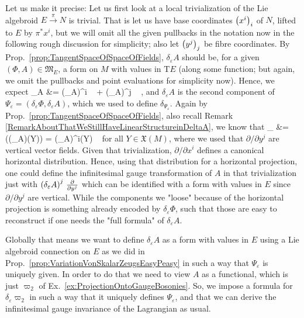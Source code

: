 Let us make it precise: Let us first look at a local trivialization of the Lie algebroid $E \stackrel{\pi}{\to} N$ is trivial. That is let us have base coordinates $\mleft( x^i \mright)_i$ of $N$, lifted to $E$ by $\pi^*x^i$, but we will omit all the given pullbacks in the notation now in the following rough discussion for simplicity; also let $\mleft( y^j \mright)_j$ be fibre coordinates. By Prop.~\ref{prop:TangentSpaceOfSpaceOfFields}, $\delta_\varepsilon A$ should be, for a given $(\Phi, A) \in \mathfrak{M}_E$, a form on $M$ with values in $\mathrm{T}E$ (along some function; but again, we omit the pullbacks and point evaluations for simplicity now). Hence, we expect
\bas
\delta_\varepsilon A
&=
\mleft(\delta_\varepsilon A\mright)^i ~ 
	+ \mleft(\delta_\varepsilon A\mright)^j ~ ,
\eas
and $\delta_\varepsilon A$ is the second component of $\Psi_\varepsilon = (\delta_\varepsilon \Phi, \delta_\varepsilon A)$, which we used to define $\delta_{\Psi_\varepsilon}$. Again by Prop.~\ref{prop:TangentSpaceOfSpaceOfFields}, also recall Remark \ref{RemarkAboutThatWeStillHaveLinearStructureinDeltaA}, we know that
\bas
\delta_\varepsilon \Phi
&=
\pi \bigl((\delta_\varepsilon A)(Y)\bigr)
=
\mleft(\delta_\varepsilon A\mright)^i(Y) ~ 
\eas
for all $Y \in \mathfrak{X}(M)$, where we used that $\partial/\partial y^j$ are vertical vector fields. Given that trivialization, $\partial/\partial x^i$ defines a canonical horizontal distribution. Hence, using that distribution for a horizontal projection, one could define the infinitesimal gauge transformation of $A$ in that trivialization just with $\mleft(\delta_\varepsilon A\mright)^j ~ \frac{\partial}{\partial y^j}$ which can be identified with a form with values in $E$ since $\partial/\partial y^j$ are vertical. While the components we "loose" because of the horizontal projection is something already encoded by $\delta_\varepsilon \Phi$, such that those are easy to reconstruct if one needs the "full formula" of $\delta_\varepsilon A$.

Globally that means we want to define $\delta_\varepsilon A$ as a form with values in $E$ using a Lie algebroid connection on $E$ as we did in Prop.~\ref{prop:VariationVonSkalarZeugsEasyPeasy} in such a way that $\Psi_\varepsilon$ is uniquely given. In order to do that we need to view $A$ as a functional, which is just $\varpi_2$ of Ex.~\ref{ex:ProjectionOntoGaugeBosonies}. So, we impose a formula for $\delta_\varepsilon \varpi_2$ in such a way that it uniquely defines $\Psi_\varepsilon$, and that we can derive the infinitesimal gauge invariance of the Lagrangian as usual.

